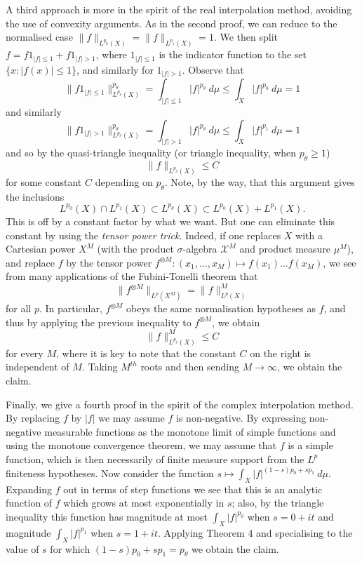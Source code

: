 \documentclass[10pt,reqno]{amsart}
\begin{document}
A third approach is more in the spirit of the real interpolation method, avoiding the use of convexity arguments. As in the second proof, we can reduce to the normalised case $\|f\|_{L^{p_0}(X)} = \|f\|_{L^{p_1}(X)} = 1$. We then split $f = f 1_{|f| \leq 1} + f 1_{|f| > 1}$, where $1_{|f| \leq 1}$ is the indicator function to the set $\{ x: |f(x)| \leq 1\}$, and similarly for $1_{|f|>1}$. Observe that
%
\[ \| f 1_{|f| \leq 1} \|_{L^{p_\theta}(X)}^{p_\theta} = \int_{|f| \leq 1} |f|^{p_\theta}\ d\mu \leq \int_X |f|^{p_0}\ d\mu = 1\]
%
and similarly
%
\[ \| f 1_{|f| > 1} \|_{L^{p_\theta}(X)}^{p_\theta} = \int_{|f| > 1} |f|^{p_\theta}\ d\mu \leq \int_X |f|^{p_1}\ d\mu = 1\]
%
and so by the quasi-triangle inequality (or triangle inequality, when $p_\theta \geq 1$)
%
\[ \|f\|_{L^{p_\theta}(X)} \leq C\]
%
for some constant $C$ depending on $p_\theta$. Note, by the way, that this argument gives the inclusions
%
\begin{equation} L^{p_0}(X) \cap L^{p_1}(X) \subset L^{p_\theta}(X) \subset L^{p_0}(X) + L^{p_1}(X). \end{equation}
%
This is off by a constant factor by what we want. But one can eliminate this constant by using the \emph{tensor power trick}. Indeed, if one replaces $X$ with a Cartesian power $X^M$ (with the product $\sigma$-algebra ${\mathcal X}^M$ and product measure $\mu^M$), and replace $f$ by the tensor power $f^{\otimes M}: (x_1,\ldots,x_M) \mapsto f(x_1) \ldots f(x_M)$, we see from many applications of the Fubini-Tonelli theorem that
%
\[ \| f^{\otimes M} \|_{L^p(X^M)} = \|f\|_{L^p(X)}^M\]
%
for all $p$. In particular, $f^{\otimes M}$ obeys the same normalisation hypotheses as $f$, and thus by applying the previous inequality to $f^{\otimes M}$, we obtain
%
\[ \|f\|_{L^{p_\theta}(X)}^M \leq C\]
%
for every $M$, where it is key to note that the constant $C$ on the right is independent of $M$. Taking $M^{th}$ roots and then sending $M \rightarrow \infty$, we obtain the claim.

Finally, we give a fourth proof in the spirit of the complex interpolation method. By replacing $f$ by $|f|$ we may assume $f$ is non-negative. By expressing non-negative measurable functions as the monotone limit of simple functions and using the monotone convergence theorem, we may assume that $f$ is a simple function, which is then necessarily of finite measure support from the $L^p$ finiteness hypotheses. Now consider the function $s \mapsto \int_X |f|^{(1-s)p_0 + s p_1}\ d\mu$. Expanding $f$ out in terms of step functions we see that this is an analytic function of $f$ which grows at most exponentially in $s$; also, by the triangle inequality this function has magnitude at most $\int_X |f|^{p_0}$ when $s=0+it$ and magnitude $\int_X |f|^{p_1}$ when $s=1+it$. Applying Theorem 4 and specialising to the value of $s$ for which $(1-s)p_0+sp_1 = p_\theta$ we obtain the claim.
\end{document}
